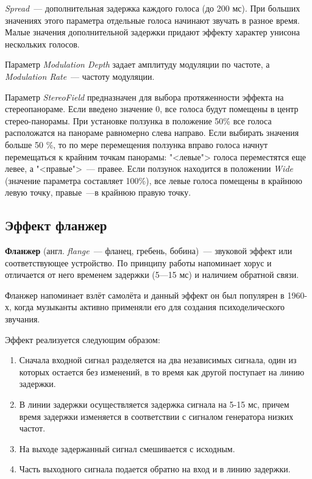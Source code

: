 \documentclass[oneside, final, 14pt]{extreport}
\begin{document}
\textit{Spread}~--- дополнительная задержка каждого голоса (до 200 мс). При больших значениях этого параметра отдельные голоса начинают звучать в разное время. Малые значения дополнительной задержки придают эффекту характер унисона нескольких голосов.

Параметр \textit{Modulation Depth} задает амплитуду модуляции по частоте, а \textit{Modulation Rate}~--- частоту модуляции.

Параметр \textit{StereoField} предназначен для выбора протяженности эффекта на стереопанораме. Если введено значение 0, все голоса будут помещены в центр стерео-панорамы. При установке ползунка в положение 50\% все голоса расположатся на панораме равномерно слева направо. Если выбирать значения больше 50 \%, то по мере перемещения ползунка вправо голоса начнут перемещаться к крайним точкам панорамы: "<левые"> голоса переместятся еще левее, а "<правые">~--- правее. Если ползунок находится в положении \emph{Wide} (значение параметра составляет 100\%), все левые голоса помещены в крайнюю левую точку, правые~---в крайнюю правую точку.

\subsection{Эффект фланжер}
\textbf{Фланжер} (англ. \textit{flange}~--- фланец, гребень, бобина)~--- звуковой эффект или соответствующее устройство. По принципу работы напоминает хорус и отличается от него временем задержки (5—15 мс) и наличием обратной связи.

Фланжер напоминает взлёт самолёта и данный эффект он был популярен в 1960-х, когда музыканты активно применяли его для создания психоделического звучания.

Эффект реализуется следующим образом:
\begin{enumerate}
  \item Сначала входной сигнал разделяется на два независимых сигнала, один из которых остается без изменений, в то время как другой поступает на линию задержки.
  \item В линии задержки осуществляется задержка сигнала на 5-15 мс, причем время задержки изменяется в соответствии с сигналом генератора низких частот.
  \item На выходе задержанный сигнал смешивается с исходным.
  \item Часть выходного сигнала подается обратно на вход и в линию задержки.
\end{enumerate}
\end{document}
